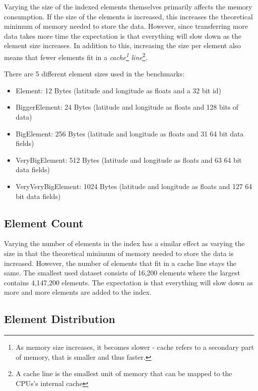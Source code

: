 Varying the size of the indexed elements themselves primarily affects the memory consumption. If the size of the elements is increased, this increases the theoretical minimum of memory needed to store the data. However, since transferring more data takes more time the expectation is that everything will slow down as the element size increases. In addition to this, increasing the size per element also means that fewer elements fit in a \textit{cache\footnote{As memory size increases, it becomes slower - cache refers to a secondary part of memory, that is smaller and thus faster.} line}\footnote{A cache line is the smallest unit of memory that can be mapped to the \acsp{CPU}'s internal cache}.

There are 5 different element sizes used in the benchmarks:

\begin{itemize}
    \item Element: 12 Bytes (latitude and longitude as floats and a 32 bit id)
    \item BiggerElement: 24 Bytes (latitude and longitude as floats and 128 bits of data)
    \item BigElement: 256 Bytes (latitude and longitude as floats and 31 64 bit data fields)
    \item VeryBigElement: 512 Bytes (latitude and longitude as floats and 63 64 bit data fields)
    \item VeryVeryBigElement: 1024 Bytes (latitude and longitude as floats and 127 64 bit data fields)
\end{itemize}

\subsection{Element Count}

Varying the number of elements in the index has a similar effect as varying the size in that the theoretical minimum of memory needed to store the data is increased. However, the number of elements that fit in a cache line stays the same. The smallest used dataset consists of 16,200 elements where the largest contains 4,147,200 elements. The expectation is that everything will slow down as more and more elements are added to the index.

\subsection{Element Distribution}

